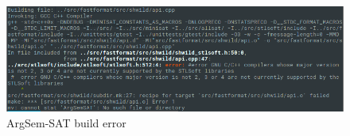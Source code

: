 \begin{figure}[h]
	\centering
	\includegraphics[width=\linewidth]{"img/argsemsat_error"}
	\caption{ArgSem-SAT build error}
	\label{fig:argsemsatBuildError}
\end{figure}


